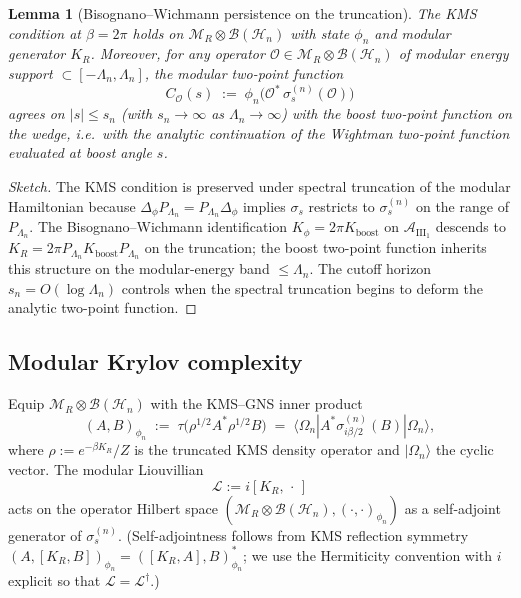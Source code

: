 \documentclass[12pt,a4paper]{article}
\newtheorem{lemma}[theorem]{Lemma}
\begin{document}
\begin{lemma}[Bisognano--Wichmann persistence on the truncation]
\label{lem:bw-trunc}
The KMS condition at $\beta = 2\pi$ holds on
$\mathcal{M}_R \otimes \mathcal{B}(\mathcal{H}_n)$ with state $\phi_n$
and modular generator $K_R$. Moreover, for any operator
$\mathcal{O} \in \mathcal{M}_R \otimes \mathcal{B}(\mathcal{H}_n)$
of modular energy support $\subset [-\Lambda_n,\Lambda_n]$, the modular
two-point function
\[
  C_\mathcal{O}(s) \;:=\; \phi_n\!\bigl(\mathcal{O}^*\, \sigma_s^{(n)}(\mathcal{O})\bigr)
\]
agrees on $|s| \le s_n$ (with $s_n \to \infty$ as $\Lambda_n\to\infty$)
with the boost two-point function on the wedge, i.e.\ with the
analytic continuation of the Wightman two-point function evaluated
at boost angle $s$.
\end{lemma}

\begin{proof}[Sketch]
The KMS condition is preserved under spectral truncation of the
modular Hamiltonian because $\Delta_\phi P_{\Lambda_n} = P_{\Lambda_n}
\Delta_\phi$ implies $\sigma_s$ restricts to $\sigma_s^{(n)}$ on the
range of $P_{\Lambda_n}$. The Bisognano--Wichmann identification
$K_\phi = 2\pi K_{\mathrm{boost}}$ on $\mathcal{A}_{\mathrm{III}_1}$
descends to $K_R = 2\pi P_{\Lambda_n} K_{\mathrm{boost}} P_{\Lambda_n}$
on the truncation; the boost two-point function inherits this
structure on the modular-energy band $\le \Lambda_n$. The cutoff
horizon $s_n = O(\log \Lambda_n)$ controls when the spectral
truncation begins to deform the analytic two-point function.
\end{proof}

\subsection{Modular Krylov complexity}
\label{ssec:krylov}

Equip $\mathcal{M}_R \otimes \mathcal{B}(\mathcal{H}_n)$ with the
KMS--GNS inner product
\begin{equation}
  (A,B)_{\phi_n} \;:=\; \tau\!\bigl(\rho^{1/2} A^* \rho^{1/2} B\bigr)
  \;=\; \langle \Omega_n | A^* \sigma_{i\beta/2}^{(n)}(B) |\Omega_n \rangle,
  \label{eq:gns}
\end{equation}
where $\rho := e^{-\beta K_R}/Z$ is the truncated KMS density operator
and $|\Omega_n\rangle$ the cyclic vector. The modular Liouvillian
\begin{equation}
  \mathcal{L} := i [K_R,\,\cdot\,]
  \label{eq:liouv}
\end{equation}
acts on the operator Hilbert space
$(\mathcal{M}_R \otimes \mathcal{B}(\mathcal{H}_n), (\cdot,\cdot)_{\phi_n})$
as a self-adjoint generator of $\sigma_s^{(n)}$. (Self-adjointness
follows from KMS reflection symmetry $(A, [K_R, B])_{\phi_n} =
([K_R, A], B)_{\phi_n}^*$; we use the Hermiticity convention with
$i$ explicit so that $\mathcal{L} = \mathcal{L}^\dagger$.)
\end{document}
